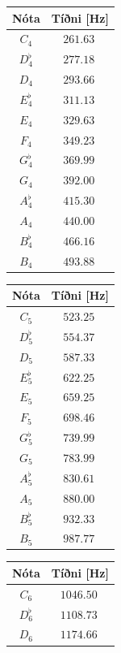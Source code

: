 \ifdefined \wholebook \else\documentclass[oneside]{book}\usepackage{EdlBook}\graphicspath{{figures/}}
\begin{document}
\begin{table}[H]
\begin{center}
\begin{tabular}{|c|c|}
\hline
\textbf{Nóta} & \textbf{Tíðni [Hz]} \\
\hline
\hline
$C_4$ & $\SI{261.63}{}$ \\
$D^\flat_4$ & $\SI{277.18}{}$ \\
$D_4$ & $\SI{293.66}{}$ \\
$E^\flat_4$ & $\SI{311.13}{}$ \\
$E_4$ & $\SI{329.63}{}$ \\
$F_4$ & $\SI{349.23}{}$ \\
$G^\flat_4$ & $\SI{369.99}{}$ \\
$G_4$ & $\SI{392.00}{}$ \\
$A^\flat_4$ & $\SI{415.30}{}$ \\
$A_4$ & $\SI{440.00}{}$ \\
$B^\flat_4$ & $\SI{466.16}{}$ \\
$B_4$ & $\SI{493.88}{}$ \\
\hline
\end{tabular}
\quad
\begin{tabular}{|c|c|}
\hline
\textbf{Nóta} & \textbf{Tíðni [Hz]} \\
\hline
\hline
$C_5$ & $\SI{523.25}{}$ \\
$D^\flat_5$ & $\SI{554.37}{}$ \\
$D_5$ & $\SI{587.33}{}$ \\
$E^\flat_5$ & $\SI{622.25}{}$ \\
$E_5$ & $\SI{659.25}{}$ \\
$F_5$ & $\SI{698.46}{}$ \\
$G^\flat_5$ & $\SI{739.99}{}$ \\
$G_5$ & $\SI{783.99}{}$ \\
$A^\flat_5$ & $\SI{830.61}{}$ \\
$A_5$ & $\SI{880.00}{}$ \\
$B^\flat_5$ & $\SI{932.33}{}$ \\
$B_5$ & $\SI{987.77}{}$ \\
\hline
\end{tabular}
\quad
\begin{tabular}{|c|c|}
\hline
\textbf{Nóta} & \textbf{Tíðni [Hz]} \\
\hline
\hline
$C_6$ & $\SI{1046.50}{}$ \\
$D^\flat_6$ & $\SI{1108.73}{}$ \\
$D_6$ & $\SI{1174.66}{}$ \\

\end{tabular}
\end{center}
\end{table}
\end{document}
